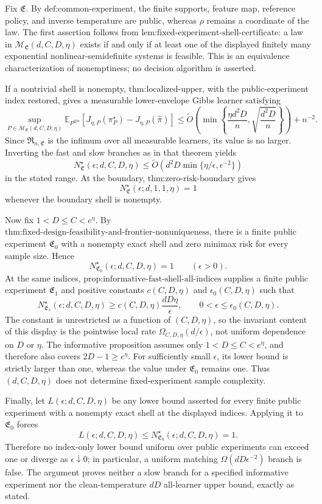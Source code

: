 Fix \(\mathfrak E\). By \(\text{def:common-experiment}\), the finite supports, feature map, reference policy, and inverse temperature are public, whereas \(\rho\) remains a coordinate of the law. The first assertion follows from \(\text{lem:fixed-experiment-shell-certificate}\): a law in \(\mathcal M_{\mathfrak E}(d,C,D,\eta)\) exists if and only if at least one of the displayed finitely many exponential nonlinear-semidefinite systems is feasible. This is an equivalence characterization of nonemptiness; no decision algorithm is asserted.

If a nontrivial shell is nonempty, \(\text{thm:localized-upper}\), with the public-experiment index restored, gives a measurable lower-envelope Gibbs learner satisfying
\[
\sup_{P\in\mathcal M_{\mathfrak E}(d,C,D,\eta)}
\mathbb E_{P^{\otimes n}}[J_{\eta,P}(\pi_P^\star)-J_{\eta,P}(\widehat\pi)]
\le\widetilde O\left(\min\left\{\frac{\eta d^2D}{n},\sqrt{\frac{d^2D}{n}}\right\}\right)+n^{-2}.
\]
Since \(\mathfrak R_{n,\mathfrak E}\) is the infimum over all measurable learners, its value is no larger. Inverting the fast and slow branches as in that theorem yields
\[
N^\star_{\mathfrak E}(\epsilon;d,C,D,\eta)
\le\widetilde O\left(d^2D\min\{\eta/\epsilon,\epsilon^{-2}\}\right)
\]
in the stated range. At the boundary, \(\text{thm:zero-risk-boundary}\) gives
\[
N^\star_{\mathfrak E}(\epsilon;d,1,1,\eta)=1
\]
whenever the boundary shell is nonempty.

Now fix \(1<D\le C<e^\eta\). By \(\text{thm:fixed-design-feasibility-and-frontier-nonuniqueness}\), there is a finite public experiment \(\mathfrak E_0\) with a nonempty exact shell and zero minimax risk for every sample size. Hence
\[
N^\star_{\mathfrak E_0}(\epsilon;d,C,D,\eta)=1
\qquad(\epsilon>0).
\]
At the same indices, \(\text{prop:informative-fast-shell-all-indices}\) supplies a finite public experiment \(\mathfrak E_1\) and positive constants \(c(C,D,\eta)\) and \(\epsilon_0(C,D,\eta)\) such that
\[
N^\star_{\mathfrak E_1}(\epsilon;d,C,D,\eta)
\ge c(C,D,\eta)\frac{dD\eta}{\epsilon},
\qquad 0<\epsilon\le\epsilon_0(C,D,\eta).
\]
The constant is unrestricted as a function of \((C,D,\eta)\), so the invariant content of this display is the pointwise local rate \(\Omega_{C,D,\eta}(d/\epsilon)\), not uniform dependence on \(D\) or \(\eta\). The informative proposition assumes only \(1<D\le C<e^\eta\), and therefore also covers \(2D-1\ge e^\eta\). For sufficiently small \(\epsilon\), its lower bound is strictly larger than one, whereas the value under \(\mathfrak E_0\) remains one. Thus \((d,C,D,\eta)\) does not determine fixed-experiment sample complexity.

Finally, let \(L(\epsilon;d,C,D,\eta)\) be any lower bound asserted for every finite public experiment with a nonempty exact shell at the displayed indices. Applying it to \(\mathfrak E_0\) forces
\[
L(\epsilon;d,C,D,\eta)
\le N^\star_{\mathfrak E_0}(\epsilon;d,C,D,\eta)=1.
\]
Therefore no index-only lower bound uniform over public experiments can exceed one or diverge as \(\epsilon\downarrow0\); in particular, a uniform matching \(\Omega(dD\epsilon^{-2})\) branch is false. The argument proves neither a slow branch for a specified informative experiment nor the clean-temperature \(dD\) all-learner upper bound, exactly as stated.